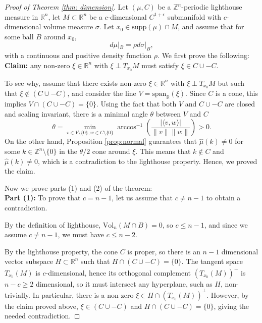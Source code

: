 \documentclass[11pt,letterpaper]{amsart}
\theoremstyle{definition}
\theoremstyle{plain}
\newcommand{\R}{{\mathbb R}}
\newcommand{\Z}{{\mathbb Z}}
\begin{document}
\begin{proof}[Proof of Theorem \ref{thm: dimension}]
Let $(\mu,C)$ be a $\Z^n$-periodic lighthouse measure in $\R^n$, let $M\subset\R^n$ be a $c$-dimensional $C^{1+\epsilon}$ submanifold with $c$-dimensional volume measure $\sigma$. Let $x_{0}\in\mathrm{supp}(\mu)\cap M$, and assume that for some ball $B$ around $x_{0}$, 
\[d\mu|_{B}=\rho d\sigma|_{B},\]
with a continuous and positive density function $\rho$. 
We first prove the following:\\
\textbf{Claim:} any non-zero $\xi\in \R^n$ with $\xi\perp T_{x_0}M$ must satisfy $\xi\in C\cup -C$. 

To see why, assume that there exists non-zero $\xi\in \R^n$ with $\xi\perp T_{x_0}M$ but such that $\xi\notin (C\cup-C)$, and consider the line $V=\mathrm{span}_{\R}(\xi)$. Since $C$ is a cone, this implies $V\cap (C\cup-C)=\{0\}$. Using the fact that both $V$ and $C\cup-C$ are closed and scaling invariant, there is a minimal angle $\theta$ between $V$ and $C$
\[\theta=\min_{v\in V\setminus\{0\},w\in C\setminus\{0\}}\arccos^{-1}\left(\frac{|\langle v,w\rangle |}{\|v\|\|w\|}\right)>0.\]
On the other hand, Proposition \ref{prop:normal} guarantees that $\widehat{\mu}(k)\ne0$ for some $k\in\Z^n\setminus\{0\}$ in the $\theta/2$ cone around $\xi$. This means that $k\notin C$ and $\widehat{\mu}(k)\ne0$, which is a contradiction to the lighthouse property. Hence, we proved the claim.

Now we prove parts (1) and (2) of the theorem:\\
\textbf{Part (1):} To prove that $c=n-1$, let us assume that $c\ne n-1$ to obtain a contradiction.


By the definition of lighthouse, $\mathrm{Vol}_{n}(M\cap B)=0$, so $c\le n-1$, and since we assume $c\ne n-1$, we must have $c\le n-2$.  


By the lighthouse property, the cone $C$ is proper, so there is an $n-1$ dimensional vector subspace $H\subset\R^n$ such that $H\cap (C\cup -C)=\{0\}$. The tangent space $T_{x_0}(M)$ is $c$-dimensional, hence its orthogonal complement $(T_{x_0}(M))^{\perp}$ is $n-c\ge 2$ dimensional, so it must intersect any hyperplane, such as $H$, non-trivially. In particular, there is a non-zero $\xi \in H\cap (T_{x_0}(M))^{\perp}$. However, by the claim proved above, $\xi\in (C\cup -C)$ and $H\cap (C\cup -C)=\{0\}$, giving the needed contradiction.



\end{proof}
\end{document}
